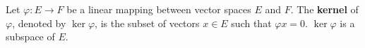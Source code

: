 Let $\varphi: E \to F$ be a linear mapping between vector spaces $E$ and $F$. The \textbf{kernel} of $\varphi$, denoted by $\ker \varphi$, is the subset of vectors $x \in E$ such that $\varphi x = 0$. $\ker \varphi$ is a subspace of $E$.
